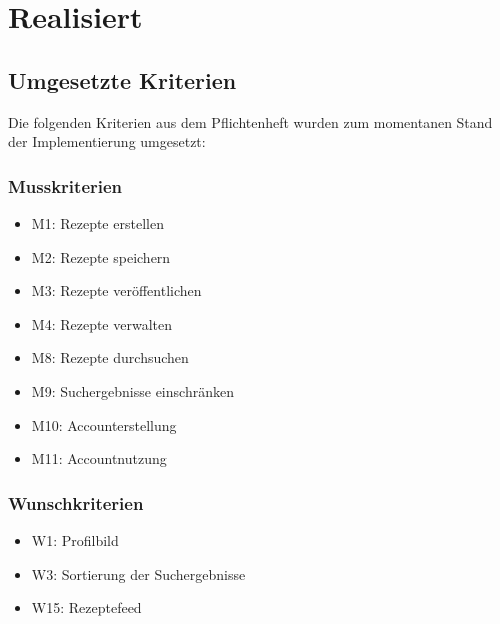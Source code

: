 \chapter{Realisiert}

\section{Umgesetzte Kriterien}

Die folgenden Kriterien aus dem Pflichtenheft wurden zum momentanen Stand der Implementierung umgesetzt:

\subsection{Musskriterien}
\begin{itemize}
	\item M1: Rezepte erstellen
	\item M2: Rezepte speichern
	\item M3: Rezepte veröffentlichen
	\item M4: Rezepte verwalten
	\item M8: Rezepte durchsuchen
	\item M9: Suchergebnisse einschränken
	\item M10: Accounterstellung
	\item M11: Accountnutzung
\end{itemize}

\subsection{Wunschkriterien}
\begin{itemize}
	\item W1: Profilbild
	\item W3: Sortierung der Suchergebnisse
	\item W15: Rezeptefeed
\end{itemize}
